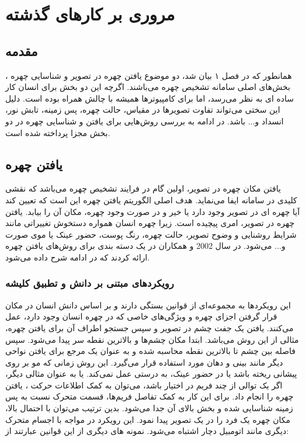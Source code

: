 \chapter{ مروری بر کارهای گذشته}

\section{مقدمه}
همانطور که در فصل ۱ بیان شد، دو موضوع یافتن چهره  در تصویر و شناسایی چهره ، بخش‌های اصلی سامانه تشخیص چهره می‌باشند. اگرچه این دو بخش برای انسان کار ساده ای به نظر می‌رسد، اما برای کامپیوتر‌ها همیشه با چالش همراه بوده است. دلیل این سختی می‌تواند تفاوت تصویرها در مقیاس، حالت چهره، پس زمینه، تابش نور، انسداد و... باشد. در ادامه به بررسی روش‌هایی برای یافتن و شناسایی چهره در دو بخش مجزا پرداخته شده است.
\section{یافتن چهره}
یافتن مکان چهره در تصویر، اولین گام در فرایند تشخیص چهره می‌باشد که نقشی کلیدی در سامانه ایفا می‌نماید. هدف اصلی الگوریتم‌ یافتن چهره این است که تعیین کند آیا چهره ای در تصویر وجود دارد یا خیر و در صورت وجود چهره، مکان آن را بیابد. یافتن چهره در تصویر، امری پیچیده است. زیرا چهره انسان همواره دستخوش تغییراتی مانند شرایط روشنایی و وضوح تصویر، حالت چهره، رنگ پوست، حضور عینک یا موی صورت و... می‌شود. در سال 2002  و همکاران در \cite{982883} یک دسته بندی برای روش‌های یافتن چهره ارائه کردند که در ادامه شرح داده می‌شود.

\subsection{ رویکردهای مبتنی بر دانش و تطبیق کلیشه}
این رویکردها به مجموعه‌ای از قوانین بستگی دارند و بر اساس دانش انسان در مکان قرار گرفتن اجزای چهره و ویژگی‌های خاصی که در چهره انسان وجود دارد، عمل می‌کنند. یافتن یک جفت چشم در تصویر و سپس جستجو اطراف آن برای یافتن چهره، مثالی از این روش می‌باشد. ابتدا مکان چشم‌ها و بالاترین نقطه سر پیدا می‌شود. سپس فاصله بین چشم تا بالاترین نقطه محاسبه شده و به عنوان یک مرجع برای یافتن نواحی دیگر مانند بینی و دهان مورد استفاده قرار می‌گیرد. این روش زمانی که مو بر روی پیشانی ریخته باشد یا در حضور عینک، به درستی عمل نمی‌کند. یا به عنوان مثالی دیگر، اگر یک توالی از چند فریم در اختیار باشد، می‌توان به کمک اطلاعات حرکت ، یافتن چهره را انجام داد. برای این کار به کمک تفاصل فریم‌ها، قسمت متحرک نسبت به پس زمینه شناسایی شده و بخش بالای آن جدا می‌شود. بدین ترتیب می‌توان با احتمال بالا، مکان چهره یک فرد را در یک تصویر پیدا نمود. این رویکرد در مواجه با اجسام متحرک دیگری مانند اتومبیل دچار اشتباه می‌شود. نمونه های دیگری از این قوانین عبارتند از:

